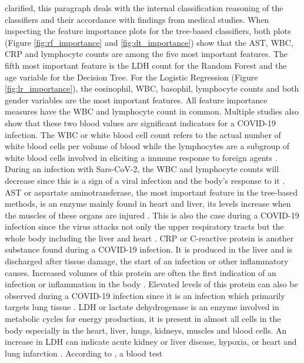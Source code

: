 clarified, this paragraph deals with the internal classification reasoning of 
the classifiers and their accordance with findings from medical studies.
When inspecting the feature importance plots for the tree-based classifiers, 
both plots (Figure \ref{fig:rf_importance} and \ref{fig:dt_importance}) show 
that the AST, WBC, CRP and lymphocyte counts are among the five most important 
features.
The fifth most important feature is the LDH count for the Random Forest and the 
age variable for the Decision Tree. For the Logistic Regression (Figure 
\ref{fig:lr_importance}), the eosinophil, WBC, basophil, lymphocyte counts and 
both gender variables are the most important features. All feature importance 
measures have the WBC and lymphocyte count in common. Multiple studies also show 
that these two blood values are significant indicators for a COVID-19 infection. 
The WBC or white blood cell count refers to the actual number of white blood 
cells per volume of blood while the lymphocytes are a subgroup of white blood 
cells 
involved in eliciting a immune response to foreign agents \cite{RN137, RN188}. 
During an infection with Sars-CoV-2, the WBC and lymphocyte counts will 
decrease since this is a sign of a viral infection and the body's response to 
it \cite{RN162,RN186, RN185}.
AST or aspartate aminotransferase, the most important feature in the tree-based 
methods, is an enzyme mainly found in heart and liver, its levels increase when 
the muscles of these organs are injured \cite{RN189, RN188}. This is also the 
case during a COVID-19 infection since the virus attacks not only the upper 
respiratory tracts but the whole body including the liver and 
heart \cite{RN182}. CRP or C-reactive protein is another substance found during 
a COVID-19 infection. It is produced in the liver and is discharged after 
tissue damage, the start of an infection or other inflammatory causes. 
Increased volumes of this protein are often the first indication of an 
infection or inflammation in the body \cite{RN138, RN188}. Elevated levels of 
this protein can also be observed during a COVID-19 infection since it is an 
infection which primarily targets lung tissue \cite{RN187, RN162}. LDH or 
lactate 
dehydrogenase is an enzyme involved in metabolic cycles for energy production, 
it is present in almost all cells in the body especially in the heart, 
liver, lungs, kidneys, muscles and blood cells. An increase in LDH can indicate 
acute kidney or liver disease, hypoxia, or heart and lung 
infarction \cite{RN190, RN188}. According to \cite{RN162, RN187}, a blood test 
